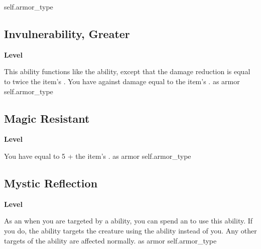  {self.armor_type}
\begin{multicols}{2}
\lowercase{\hypertarget{item:Invulnerability, Greater}{}}\label{item:Invulnerability, Greater}
\hypertarget{item:Invulnerability, Greater}{\subsection{Invulnerability, Greater}}
\columnbreak%
\begin{flushright}
\large\textbf{ Level}
\end{flushright}
\end{multicols}
\vspace{-1.5em}  %
This ability functions like the  ability, except that the damage reduction is equal to twice the item's .
You have  against  damage equal to the item's .
 
 as armor
 {self.armor_type}
\begin{multicols}{2}
\lowercase{\hypertarget{item:Magic Resistant}{}}\label{item:Magic Resistant}
\hypertarget{item:Magic Resistant}{\subsection{Magic Resistant}}
\columnbreak%
\begin{flushright}
\large\textbf{ Level}
\end{flushright}
\end{multicols}
\vspace{-1.5em}  %
You have  equal to 5 + the item's .
 
 as armor
 {self.armor_type}
\begin{multicols}{2}
\lowercase{\hypertarget{item:Mystic Reflection}{}}\label{item:Mystic Reflection}
\hypertarget{item:Mystic Reflection}{\subsection{Mystic Reflection}}
\columnbreak%
\begin{flushright}
\large\textbf{ Level}
\end{flushright}
\end{multicols}
\vspace{-1.5em}  %
As an  when you are targeted by a   ability, you can spend an  to use this ability.
If you do, the ability targets the creature using the ability instead of you.
Any other targets of the ability are affected normally.
 
 as armor
 {self.armor_type}
